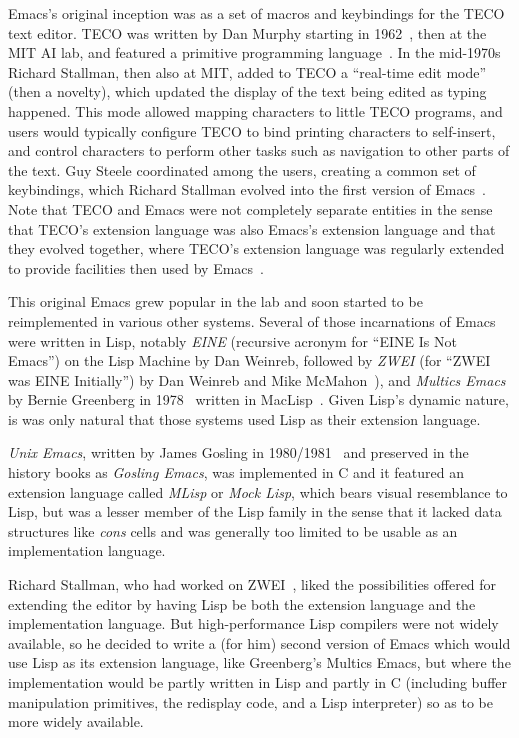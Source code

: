 \documentclass[format=acmsmall, review]{acmart}
\begin{document}
Emacs's original inception was as a set of macros and keybindings for the
TECO text editor.  TECO was written by Dan Murphy starting in
1962~\cite{Murphy09}, then at the MIT AI lab, and featured a primitive
programming language~\cite{Stallman2018-personal}.  In the mid-1970s Richard
Stallman, then also at MIT, added to TECO a ``real-time edit mode'' (then
a novelty), which updated the display of the text being edited as typing
happened.  This mode allowed mapping characters to little TECO programs, and
users would typically configure TECO to bind printing characters to
self-insert, and control characters to perform other tasks such as
navigation to other parts of the text.  Guy Steele
coordinated among the users, creating a common set of keybindings, which
Richard Stallman evolved into the first version of Emacs~\cite{EmacsLore,Seibel2009}.
Note that TECO and Emacs were not completely separate entities in the sense
that TECO's extension language was also Emacs's extension language and that
they evolved together, where TECO's extension language was regularly
extended to provide facilities then used by Emacs~\cite{Stallman2002}.

This original Emacs grew popular in the lab and soon started to be
reimplemented in various other systems.  Several of those incarnations of
Emacs were written in Lisp, notably \emph{EINE} (recursive acronym for
``EINE Is Not Emacs'') on the Lisp Machine by Dan Weinreb, followed by
\emph{ZWEI} (for ``ZWEI was EINE Initially'') by Dan Weinreb and Mike
McMahon~\cite{Weinreb1979}), and \emph{Multics Emacs} by Bernie Greenberg in
1978~\cite{Stallman2002} written in MacLisp~\cite{Moon1974,Pitman1983}.
Given Lisp's dynamic nature, is was only natural that those systems used
Lisp as their extension language.

\emph{Unix Emacs}, written by James Gosling in 1980/1981~\cite{Gosling1981}
and preserved in the history books as \emph{Gosling Emacs},
was implemented in C and it featured an extension
language called \emph{MLisp} or \emph{Mock Lisp}, which bears visual
resemblance to Lisp, but was a lesser member of the Lisp family in the
sense that it lacked data structures like \emph{cons} cells and was
generally too limited to be usable as an implementation language.

Richard Stallman, who had worked on
ZWEI~\cite{Stallman2018-personal}, liked the possibilities offered for
extending the editor by having Lisp be both the extension language and the
implementation language.  But high-performance Lisp compilers were not
widely available, so he decided to write a (for him) second version of Emacs
which would use Lisp as its extension language, like Greenberg's Multics
Emacs, but where the implementation would be partly written in Lisp and
partly in C (including buffer manipulation primitives, the redisplay code,
and a Lisp interpreter) so as to be more widely available.
\end{document}
